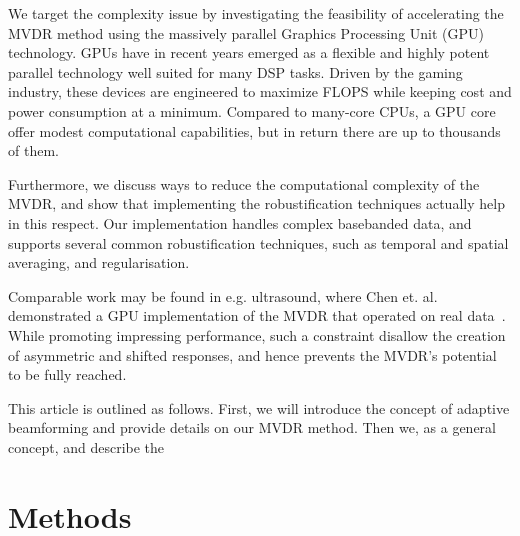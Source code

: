 \documentclass[12pt,journal,captionsoff,onecolumn]{IEEEtran}
\newcounter{todoidx}
\newlength\marginparwidthsmall
\newcommand\todo[1]{%
      \addtocounter{todoidx}{1}%
      {\color{Red}\fbox{\bf\thetodoidx{}}}%
      \marginpar{%
         {\vspace*{-10pt}\color{Red}\fbox{\bf\thetodoidx{}}}\\%
         \fcolorbox{red}{todobackground}{\parbox{\marginparwidthsmall}{\scriptsize #1}}}}
\newcommand\todo[1]{}
\newcommand\1{\vec 1}
\begin{document}
We target the complexity issue by investigating the feasibility of accelerating the MVDR method using the massively parallel Graphics Processing Unit (GPU) technology. GPUs have in recent years emerged as a flexible and highly potent parallel technology well suited for many DSP tasks. Driven by the gaming industry, these devices are engineered to maximize FLOPS while keeping cost and power consumption at a minimum. Compared to many-core CPUs, a GPU core offer modest computational capabilities, but in return there are up to thousands of them. 

Furthermore, we discuss ways to reduce the computational complexity of the MVDR, and show that implementing the robustification techniques actually help in this respect. Our implementation handles complex basebanded data, and supports several common robustification techniques, such as temporal and spatial averaging, and regularisation.

Comparable work may be found in e.g. ultrasound, where Chen et. al. demonstrated a GPU implementation of the MVDR that operated on real data~\cite{Chen2011,Chen2011a}. While promoting impressing performance, such a constraint disallow the creation of asymmetric and shifted responses, and hence prevents the MVDR's potential to be fully reached. \todo{improve}

This article is outlined as follows. First, we will introduce the concept of adaptive beamforming and provide details on our MVDR method. Then we,  as a general concept, and describe the 







\section{Methods}\label{methods}
\end{document}
